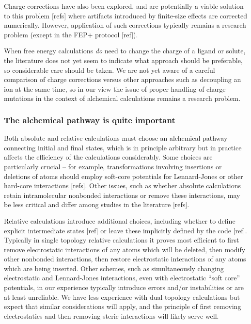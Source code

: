 \documentclass[9pt,bestpractices]{livecoms}
\begin{document}
Charge corrections have also been explored, and are potentially a viable solution to this problem [refs] where artifacts introduced by finite-size effects are corrected numerically.
However, application of such corrections typically remains a research problem (except in the FEP+ protocol [ref]).

When free energy calculations \emph{do} need to change the charge of a ligand or solute, the literature does not yet seem to indicate what approach should be preferable, so considerable care should be taken.
We are not yet aware of a careful comparison of charge corrections versus other approaches such as decoupling an ion at the same time, so in our view the issue of proper handling of charge mutations in the context of alchemical calculations remains a research problem.

\subsubsection{The alchemical pathway is quite important}


Both absolute and relative calculations must choose an alchemical pathway connecting initial and final states, which is in principle arbitrary but in practice affects the efficiency of the calculations considerably.
Some choices are particularly crucial -- for example, transformations involving insertions or deletions of atoms should employ soft-core potentials for Lennard-Jones or other hard-core interactions [refs].
Other issues, such as whether absolute calculations retain intramolecular nonbonded interactions or remove these interactions, may be less critical and differ among studies in the literature [refs].

Relative calculations introduce additional choices, including whether to define explicit intermediate states [ref] or leave these implicitly defined by the code [ref].
Typically in single topology relative calculations it proves most efficient to first remove electrostatic interactions of any atoms which will be deleted, then modify other nonbonded interactions, then restore electrostatic interactions of any atoms which are being inserted.
Other schemes, such as simultaneously changing electrostatic and Lennard-Jones interactions, even with electrostatic ``soft core'' potentials, in our experience typically introduce errors and/or instabilities or are at least unreliable.
We have less experience with dual topology calculations but expect that similar considerations will apply, and the principle of first removing electrostatics and then removing steric interactions will likely serve well.
\end{document}

